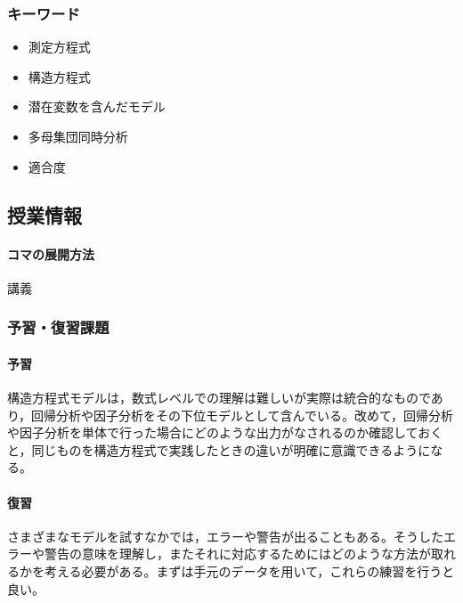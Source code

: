 \subsubsection{キーワード}
\begin{itemize}
    \item 測定方程式
    \item 構造方程式
    \item 潜在変数を含んだモデル
    \item 多母集団同時分析
    \item 適合度
    \end{itemize}
\subsection{授業情報}
\paragraph{コマの展開方法}
講義
\subsubsection{予習・復習課題}
\paragraph{予習} 構造方程式モデルは，数式レベルでの理解は難しいが実際は統合的なものであり，回帰分析や因子分析をその下位モデルとして含んでいる。改めて，回帰分析や因子分析を単体で行った場合にどのような出力がなされるのか確認しておくと，同じものを構造方程式で実践したときの違いが明確に意識できるようになる。
\paragraph{復習} さまざまなモデルを試すなかでは，エラーや警告が出ることもある。そうしたエラーや警告の意味を理解し，またそれに対応するためにはどのような方法が取れるかを考える必要がある。まずは手元のデータを用いて，これらの練習を行うと良い。